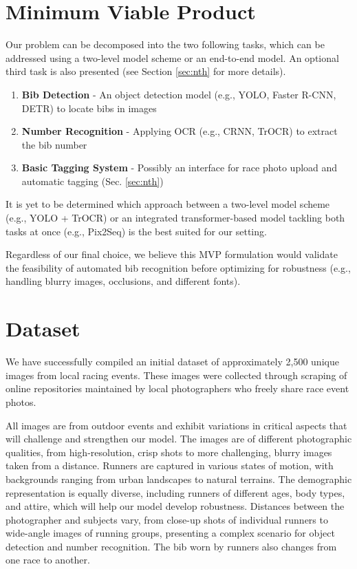 \documentclass[twocolumn,superscriptaddress,aps]{revtex4-1}
\begin{document}
\section{Minimum Viable Product}

Our problem can be decomposed into the two following tasks, which can be addressed using a two-level model scheme or an end-to-end model. An optional third task is also presented (see Section \ref{sec:nth} for more details).
\begin{enumerate}
    \item \textbf{Bib Detection} - An object detection model (e.g., YOLO\cite{redmon_you_2016}, Faster R-CNN\cite{ren_faster_2015}, DETR\cite{carion_end--end_2020}) to locate bibs in images

    \item \textbf{Number Recognition} - Applying OCR (e.g., CRNN, TrOCR\cite{li_trocr_2022}) to extract the bib number

    \item \textbf{Basic Tagging System} - Possibly an interface for race photo upload and automatic tagging (Sec. \ref{sec:nth})
\end{enumerate}
It is yet to be determined which approach between a two-level model scheme (e.g., YOLO + TrOCR) or an integrated transformer-based model tackling both tasks at once (e.g., Pix2Seq\cite{chen_pix2seq_2022}) is the best suited for our setting. 

Regardless of our final choice, we believe this MVP formulation would validate the feasibility of automated bib recognition before optimizing for robustness (e.g., handling blurry images, occlusions, and different fonts).


\section{Dataset}

We have successfully compiled an initial dataset of approximately 2,500 unique images from local racing events. These images were collected through scraping of online repositories maintained by local photographers who freely share race event photos.

All images are from outdoor events and exhibit variations in critical aspects that will challenge and strengthen our model. The images are of different photographic qualities, from high-resolution, crisp shots to more challenging, blurry images taken from a distance. Runners are captured in various states of motion, with backgrounds ranging from urban landscapes to natural terrains. The demographic representation is equally diverse, including runners of different ages, body types, and attire, which will help our model develop robustness. Distances between the photographer and subjects vary, from close-up shots of individual runners to wide-angle images of running groups, presenting a complex scenario for object detection and number recognition. The bib worn by runners also changes from one race to another.
\end{document}
